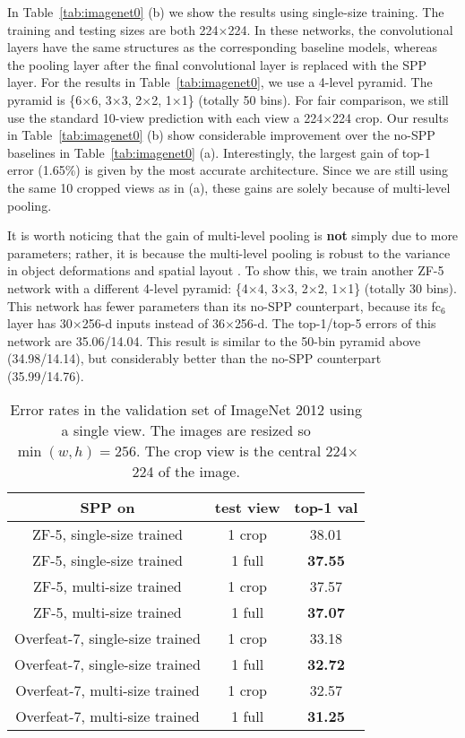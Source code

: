 \documentclass[10pt,journal,cspaper,compsoc]{IEEEtran}
\begin{document}
In Table~\ref{tab:imagenet0} (b) we show the results using single-size training. The training and testing sizes are both 224$\times$224. In these networks, the convolutional layers have the same structures as the corresponding baseline models, whereas the pooling layer after the final convolutional layer is replaced with the SPP layer. For the results in Table~\ref{tab:imagenet0}, we use a 4-level pyramid. The pyramid is \{6$\times$6, 3$\times$3,  2$\times$2, 1$\times$1\} (totally 50 bins). For fair comparison, we still use the standard 10-view prediction with each view a 224$\times$224 crop.
Our results in Table~\ref{tab:imagenet0} (b) show considerable improvement over the no-SPP baselines in Table~\ref{tab:imagenet0} (a). Interestingly, the largest gain of top-1 error (1.65\%) is given by the most accurate architecture. Since we are still using the same 10 cropped views as in (a), these gains are solely because of multi-level pooling.

It is worth noticing that the gain of multi-level pooling is \textbf{not} simply due to more parameters; rather, it is because the multi-level pooling is robust to the variance in object deformations and spatial layout \cite{Lazebnik2006}. To show this, we train another ZF-5 network with a different 4-level pyramid: \{4$\times$4, 3$\times$3,  2$\times$2, 1$\times$1\} (totally 30 bins). This network has fewer parameters than its no-SPP counterpart, because its fc$_6$ layer has 30$\times$256-d inputs instead of 36$\times$256-d. The top-1/top-5 errors of this network are 35.06/14.04. This result is similar to the 50-bin pyramid above (34.98/14.14), but considerably better than the no-SPP counterpart (35.99/14.76).

\setlength{\tabcolsep}{3pt}
\begin{table}[t]
\footnotesize
\begin{center}
\begin{tabular}{c|c|c}
\hline
 SPP on & test view & top-1 val \\
\hline
ZF-5, single-size trained & 1 crop & 38.01\\
ZF-5, single-size trained & 1 full & \textbf{37.55}\\
\hline
ZF-5, multi-size trained & 1 crop & 37.57\\
ZF-5, multi-size trained & 1 full & \textbf{37.07}\\
\hline
\hline
Overfeat-7, single-size trained & 1 crop & 33.18\\
Overfeat-7, single-size trained & 1 full & \textbf{32.72}\\
\hline
Overfeat-7, multi-size trained & 1 crop & 32.57\\
Overfeat-7, multi-size trained & 1 full & \textbf{31.25}\\
\hline
\end{tabular}
\end{center}
\caption{Error rates in the validation set of ImageNet 2012 using a single view. The images are resized so $\min(w,h)=256$. The crop view is the central 224$\times$224 of the image.}
\label{tab:imagenet_fullview}
\end{table}
\end{document}

